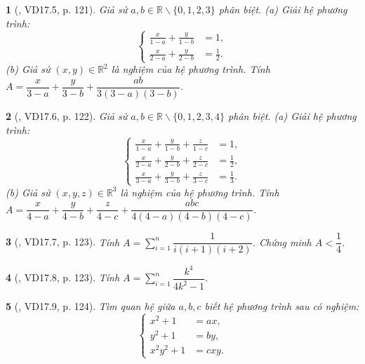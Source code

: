 \documentclass{article}
\newtheorem{baitoan}{}
\begin{document}
\begin{baitoan}[\cite{TLCT_THCS_Toan_9_dai_so}, VD17.5, p. 121]
	Giả sử $a,b\in\mathbb{R}\backslash\{0,1,2,3\}$ phân biệt. (a) Giải hệ phương trình:
	\begin{equation*}
		\left\{\begin{split}
			\frac{x}{1 - a} + \frac{y}{1 - b} &= 1,\\
			\frac{x}{2 - a} + \frac{y}{2 - b} &= \frac{1}{2}.
		\end{split}\right.
	\end{equation*}
	(b) Giả sử $(x,y)\in\mathbb{R}^2$ là nghiệm của hệ phương trình. Tính $A = \dfrac{x}{3 - a} + \dfrac{y}{3 - b} + \dfrac{ab}{3(3 - a)(3 - b)}$.
\end{baitoan}

\begin{baitoan}[\cite{TLCT_THCS_Toan_9_dai_so}, VD17.6, p. 122]
	Giả sử $a,b\in\mathbb{R}\backslash\{0,1,2,3,4\}$ phân biệt. (a) Giải hệ phương trình:
	\begin{equation*}
		\left\{\begin{split}
			\frac{x}{1 - a} + \frac{y}{1 - b} + \frac{z}{1 - c} &= 1,\\
			\frac{x}{2 - a} + \frac{y}{2 - b} + \frac{z}{2 - c} &= \frac{1}{2},\\
			\frac{x}{3 - a} + \frac{y}{3 - b} + \frac{z}{3 - c} &= \frac{1}{3}.
		\end{split}\right.
	\end{equation*}
	(b) Giả sử $(x,y,z)\in\mathbb{R}^3$ là nghiệm của hệ phương trình. Tính $A = \dfrac{x}{4 - a} + \dfrac{y}{4 - b} + \dfrac{z}{4 - c} + \dfrac{abc}{4(4 - a)(4 - b)(4 - c)}$.
\end{baitoan}

\begin{baitoan}[\cite{TLCT_THCS_Toan_9_dai_so}, VD17.7, p. 123]
	Tính $A = \sum_{i=1}^n \dfrac{1}{i(i + 1)(i + 2)}$. Chứng minh $A < \dfrac{1}{4}$.
\end{baitoan}

\begin{baitoan}[\cite{TLCT_THCS_Toan_9_dai_so}, VD17.8, p. 123]
	Tính $A = \sum_{i=1}^n \dfrac{k^4}{4k^2 - 1}$.
\end{baitoan}

\begin{baitoan}[\cite{TLCT_THCS_Toan_9_dai_so}, VD17.9, p. 124]
	Tìm quan hệ giữa $a,b,c$ biết hệ phương trình sau có nghiệm:
	\begin{equation*}
		\left\{\begin{split}
			x^2 + 1 &= ax,\\
			y^2 + 1 &= by,\\
			x^2y^2 + 1 &= cxy.
		\end{split}\right.
	\end{equation*}
\end{baitoan}
\end{document}
